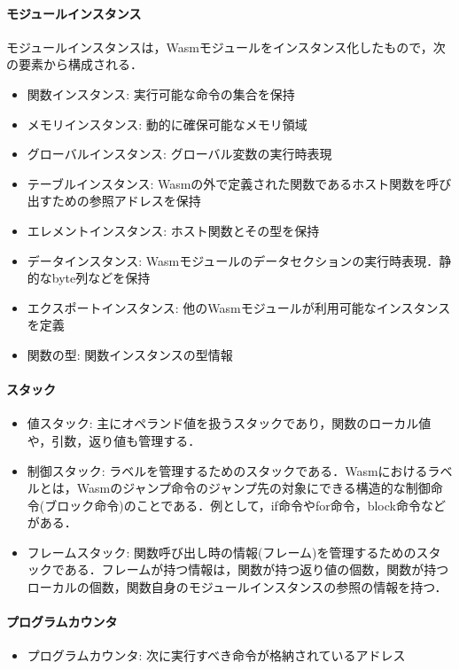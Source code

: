 \paragraph*{モジュールインスタンス}
モジュールインスタンスは，Wasmモジュールをインスタンス化したもので，次の要素から構成される．
\begin{itemize}
    \item 関数インスタンス: 実行可能な命令の集合を保持
    \item メモリインスタンス: 動的に確保可能なメモリ領域
    \item グローバルインスタンス: グローバル変数の実行時表現
    \item テーブルインスタンス: Wasmの外で定義された関数であるホスト関数を呼び出すための参照アドレスを保持
    \item エレメントインスタンス: ホスト関数とその型を保持
    \item データインスタンス: Wasmモジュールのデータセクションの実行時表現．静的なbyte列などを保持
    \item エクスポートインスタンス: 他のWasmモジュールが利用可能なインスタンスを定義
    \item 関数の型: 関数インスタンスの型情報
\end{itemize}

\vspace*{0.5zh}
\paragraph*{スタック}
\begin{itemize}
    \item 値スタック: 主にオペランド値を扱うスタックであり，関数のローカル値や，引数，返り値も管理する．
    \item 制御スタック: ラベルを管理するためのスタックである．Wasmにおけるラベルとは，Wasmのジャンプ命令のジャンプ先の対象にできる構造的な制御命令(ブロック命令)のことである．例として，if命令やfor命令，block命令などがある．
    \item フレームスタック: 関数呼び出し時の情報(フレーム)を管理するためのスタックである．フレームが持つ情報は，関数が持つ返り値の個数，関数が持つローカルの個数，関数自身のモジュールインスタンスの参照の情報を持つ．
\end{itemize}

\vspace*{0.5zh}
\paragraph*{プログラムカウンタ}
\begin{itemize}
    \item プログラムカウンタ: 次に実行すべき命令が格納されているアドレス
\end{itemize}
